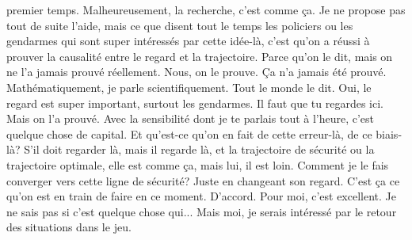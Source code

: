 premier temps. Malheureusement, la recherche, c'est comme ça. Je ne propose pas tout de suite l'aide, mais ce que disent tout le temps les policiers ou les gendarmes qui sont super intéressés par cette idée-là, c'est qu'on a réussi à prouver la causalité entre le regard et la trajectoire. Parce qu'on le dit, mais on ne l'a jamais prouvé réellement. Nous, on le prouve. Ça n'a jamais été prouvé. Mathématiquement, je parle scientifiquement. Tout le monde le dit. Oui, le regard est super important, surtout les gendarmes. Il faut que tu regardes ici. Mais on l'a prouvé. Avec la sensibilité dont je te parlais tout à l'heure, c'est quelque chose de capital. Et qu'est-ce qu'on en fait de cette erreur-là, de ce biais-là? S'il doit regarder là, mais il regarde là, et la trajectoire de sécurité ou la trajectoire optimale, elle est comme ça, mais lui, il est loin. Comment je le fais converger vers cette ligne de sécurité? Juste en changeant son regard. C'est ça ce qu'on est en train de faire en ce moment. D'accord. Pour moi, c'est excellent. Je ne sais pas si c'est quelque chose qui... Mais moi, je serais intéressé par le retour des situations dans le jeu.

